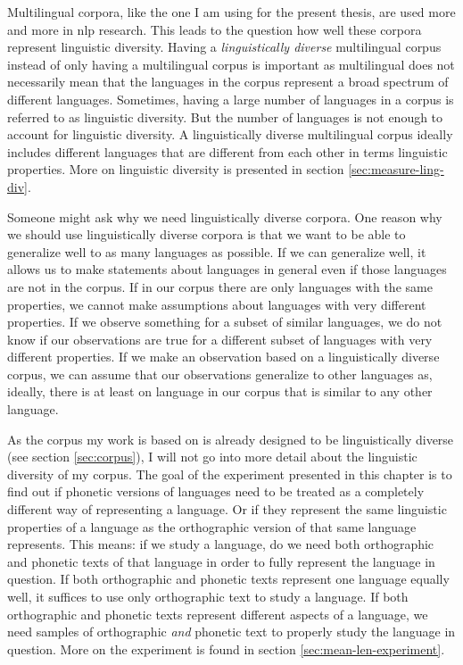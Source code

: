 
\label{chap:mwl}
Multilingual corpora, like the one I am using for the present thesis, are used more and more in \ac{nlp} research. This leads to the question how well these corpora represent linguistic diversity. Having a \textit{linguistically diverse} multilingual corpus instead of only having a multilingual corpus is important as multilingual does not necessarily mean that the languages in the corpus represent a broad spectrum of different languages. Sometimes, having a large number of languages in a corpus is referred to as linguistic diversity. But the number of languages is not enough to account for linguistic diversity. A linguistically diverse multilingual corpus ideally includes different languages that are different from each other in terms linguistic properties. More on linguistic diversity is presented in section \ref{sec:measure-ling-div}.

Someone might ask why we need linguistically diverse corpora. One reason why we should use linguistically diverse corpora is that we want to be able to generalize well to as many languages as possible. If we can generalize well, it allows us to make statements about languages in general even if those languages are not in the corpus. If in our corpus there are only languages with the same properties, we cannot make assumptions about languages with very different properties. If we observe something for a subset of similar languages, we do not know if our observations are true for a different subset of languages with very different properties. If we make an observation based on a linguistically diverse corpus, we can assume that our observations generalize to other languages as, ideally, there is at least on language in our corpus that is similar to any other language.

As the corpus my work is based on is already designed to be linguistically diverse (see section \ref{sec:corpus}), I will not go into more detail about the linguistic diversity of my corpus. The goal of the experiment presented in this chapter is to find out if phonetic versions of languages need to be treated as a completely different way of representing a language. Or if they represent the same linguistic properties of a language as the orthographic version of that same language represents. This means: if we study a language, do we need both orthographic and phonetic texts of that language in order to fully represent the language in question. If both orthographic and phonetic texts represent one language equally well, it suffices to use only orthographic text to study a language. If both orthographic and phonetic texts represent different aspects of a language, we need samples of orthographic \textit{and} phonetic text to properly study the language in question. More on the experiment is found in section \ref{sec:mean-len-experiment}.


